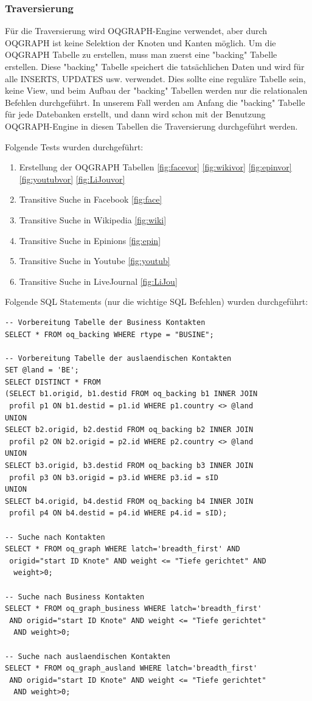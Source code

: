 \newpage

\subsubsection{Traversierung}
Für die Traversierung wird OQGRAPH-Engine verwendet, aber durch OQGRAPH ist keine Selektion der Knoten und Kanten möglich. Um die OQGRAPH Tabelle zu erstellen, muss man zuerst eine "backing" Tabelle erstellen. Diese "backing" Tabelle speichert die tatsächlichen Daten und wird für alle INSERTS, UPDATES usw. verwendet. Dies sollte eine reguläre Tabelle sein, keine View, und beim Aufbau der "backing" Tabellen werden nur die relationalen Befehlen durchgeführt. 
In unserem Fall werden am Anfang die "backing" Tabelle für jede Datebanken erstellt, und dann wird schon mit der Benutzung OQGRAPH-Engine in diesen Tabellen die Traversierung durchgeführt werden.

Folgende Tests wurden durchgeführt:
\begin{enumerate}
	\item Erstellung der OQGRAPH Tabellen \ref{fig:facevor}
	\ref{fig:wikivor}
	\ref{fig:epinvor}
	\ref{fig:youtubvor}
	\ref{fig:LiJouvor}
	\item Transitive Suche in Facebook
	\ref{fig:face}
	\item Transitive Suche in Wikipedia
	\ref{fig:wiki}
	\item Transitive Suche in Epinions 
	\ref{fig:epin}
	\item Transitive Suche in Youtube 
	\ref{fig:youtub}
	\item Transitive Suche in LiveJournal 
	\ref{fig:LiJou}
\end{enumerate}


Folgende SQL Statements (nur die wichtige SQL Befehlen) wurden durchgeführt:
\begin{lstlisting}
-- Vorbereitung Tabelle der Business Kontakten
SELECT * FROM oq_backing WHERE rtype = "BUSINE";

-- Vorbereitung Tabelle der auslaendischen Kontakten
SET @land = 'BE';
SELECT DISTINCT * FROM 
(SELECT b1.origid, b1.destid FROM oq_backing b1 INNER JOIN
 profil p1 ON b1.destid = p1.id WHERE p1.country <> @land
UNION
SELECT b2.origid, b2.destid FROM oq_backing b2 INNER JOIN
 profil p2 ON b2.origid = p2.id WHERE p2.country <> @land
UNION
SELECT b3.origid, b3.destid FROM oq_backing b3 INNER JOIN
 profil p3 ON b3.origid = p3.id WHERE p3.id = sID
UNION
SELECT b4.origid, b4.destid FROM oq_backing b4 INNER JOIN
 profil p4 ON b4.destid = p4.id WHERE p4.id = sID);
 
-- Suche nach Kontakten
SELECT * FROM oq_graph WHERE latch='breadth_first' AND
 origid="start ID Knote" AND weight <= "Tiefe gerichtet" AND
  weight>0;
  
-- Suche nach Business Kontakten
SELECT * FROM oq_graph_business WHERE latch='breadth_first'
 AND origid="start ID Knote" AND weight <= "Tiefe gerichtet"
  AND weight>0;
  
-- Suche nach auslaendischen Kontakten
SELECT * FROM oq_graph_ausland WHERE latch='breadth_first'
 AND origid="start ID Knote" AND weight <= "Tiefe gerichtet"
  AND weight>0;
\end{lstlisting}


